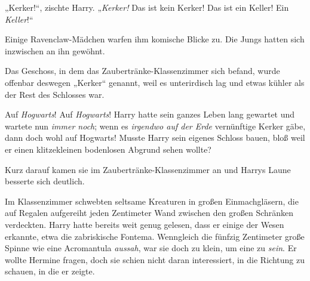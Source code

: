 „Kerker!“, zischte Harry. „\emph{Kerker!} Das ist kein Kerker! Das ist ein Keller! Ein \emph{Keller}!“

Einige Ravenclaw-Mädchen warfen ihm komische Blicke zu. Die Jungs hatten sich inzwischen an ihn gewöhnt.

Das Geschoss, in dem das Zaubertränke-Klassenzimmer sich befand, wurde offenbar deswegen „Kerker“ genannt, weil es unterirdisch lag und etwas kühler als der Rest des Schlosses war.

Auf \emph{Hogwarts}! Auf \emph{Hogwarts}! Harry hatte sein ganzes Leben lang gewartet und wartete nun \emph{immer noch}; wenn es \emph{irgendwo auf der Erde} vernünftige Kerker gäbe, dann doch wohl auf Hogwarts! Musste Harry sein eigenes Schloss bauen, bloß weil er einen klitzekleinen bodenlosen Abgrund sehen wollte?

Kurz darauf kamen sie im Zaubertränke-Klassenzimmer an und Harrys Laune besserte sich deutlich.

Im Klassenzimmer schwebten seltsame Kreaturen in großen Einmachgläsern, die auf Regalen aufgereiht jeden Zentimeter Wand zwischen den großen Schränken verdeckten. Harry hatte bereits weit genug gelesen, dass er einige der Wesen erkannte, etwa die zabriskische Fontema. Wenngleich die fünfzig Zentimeter große Spinne wie eine Acromantula \emph{aussah}, war sie doch zu klein, um eine zu \emph{sein}. Er wollte Hermine fragen, doch sie schien nicht daran interessiert, in die Richtung zu schauen, in die er zeigte.

